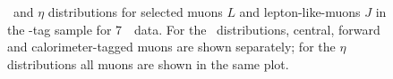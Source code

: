 \begin{figure}[h]
{        }
    \caption[\pt\ and $\eta$ distributions for selected muons $L$ and
    lepton-like-muons $J$ in the \Z-tag sample for 7~\tev\ data.]
    {\small \pt\ and $\eta$ distributions for selected muons $L$ and
    lepton-like-muons $J$ in the \Z-tag sample for 7~\tev\ data. 
    For the \pt\ distributions, central, forward and calorimeter-tagged muons are shown
    separately; for the $\eta$ distributions all muons are
    shown in the same plot.}
\label{fig:ljdist-mu-seven} 
\end{figure}

